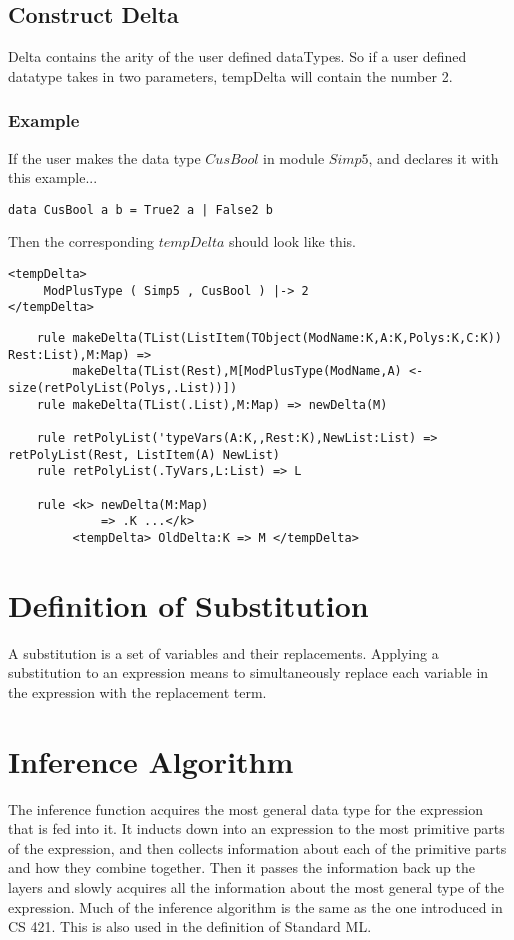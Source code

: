\subsection{Construct Delta}
Delta contains the arity of the user defined dataTypes. So if a user defined datatype takes in two parameters, tempDelta will contain the number 2.

\subsubsection{Example}
If the user makes the data type $CusBool$ in module $Simp5$, and declares it with this example...
\begin{lstlisting}
data CusBool a b = True2 a | False2 b
\end{lstlisting}

Then the corresponding $tempDelta$ should look like this.

\begin{lstlisting}
<tempDelta>
     ModPlusType ( Simp5 , CusBool ) |-> 2
</tempDelta>
\end{lstlisting}

\begin{lstlisting}
    rule makeDelta(TList(ListItem(TObject(ModName:K,A:K,Polys:K,C:K)) Rest:List),M:Map) =>
         makeDelta(TList(Rest),M[ModPlusType(ModName,A) <- size(retPolyList(Polys,.List))])
    rule makeDelta(TList(.List),M:Map) => newDelta(M)

    rule retPolyList('typeVars(A:K,,Rest:K),NewList:List) => retPolyList(Rest, ListItem(A) NewList)
    rule retPolyList(.TyVars,L:List) => L

    rule <k> newDelta(M:Map)
             => .K ...</k>
         <tempDelta> OldDelta:K => M </tempDelta>

\end{lstlisting}


\section{Definition of Substitution}
A substitution is a set of variables and their replacements. Applying a substitution to an expression means to simultaneously replace each variable in the expression with the replacement term. \cite{Infer:TypeSub}

\section{Inference Algorithm}
The inference function acquires the most general data type for the expression that is fed into it. It inducts down into an expression to the most primitive parts of the expression, and then collects information about each of the primitive parts and how they combine together. Then it passes the information back up the layers and slowly acquires all the information about the most general type of the expression. 
Much of the inference algorithm is the same as the one introduced in CS 421. This is also used in the definition of Standard ML. \cite{CS421:Unif, Milner90thedefinition}

